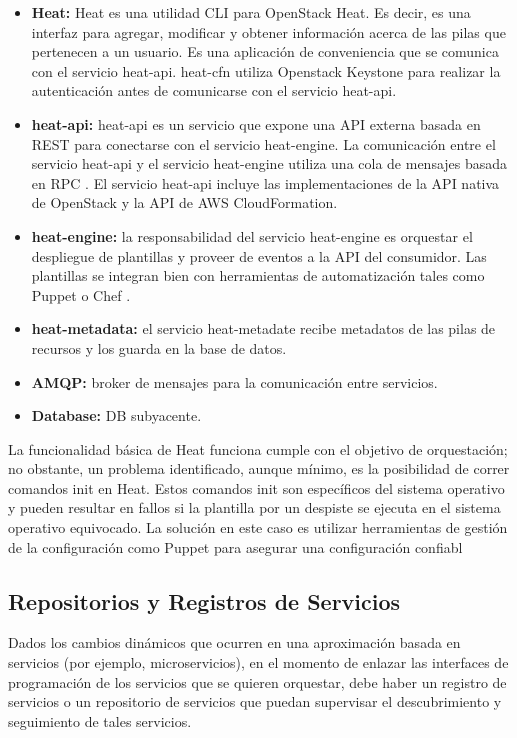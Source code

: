 \begin{itemize}
\item \textbf{Heat:} Heat es una utilidad CLI para OpenStack Heat. Es decir, es una interfaz para agregar, modificar y obtener información acerca de las pilas que pertenecen a un usuario. Es una aplicación de conveniencia que se comunica con el servicio heat-api. heat-cfn utiliza Openstack Keystone para realizar la autenticación antes de comunicarse con el servicio heat-api.
\item \textbf{heat-api:} heat-api es un servicio que expone una API externa basada en REST \parencite{Richardson2008-ng} para conectarse con el servicio heat-engine. La comunicación entre el servicio heat-api y el servicio heat-engine utiliza una cola de mensajes basada en RPC \parencite{Arpaci-Dusseau2015-px}. El servicio heat-api incluye las implementaciones de la API nativa de OpenStack y la API de AWS CloudFormation.
\item \textbf{heat-engine:} la responsabilidad del servicio heat-engine es orquestar el despliegue de plantillas y proveer de eventos a la API del consumidor. Las plantillas se integran bien con herramientas de automatización tales como Puppet \parencite{Puppet2016-ao} o Chef \parencite{Chef2016-cc}.
\item \textbf{heat-metadata:} el servicio heat-metadate recibe metadatos de las pilas de recursos y los guarda en la base de datos.
\item \textbf{AMQP:} broker de mensajes para la comunicación entre servicios.
\item \textbf{Database:} DB subyacente.
\end{itemize}

La funcionalidad básica de Heat funciona cumple con el objetivo de orquestación; no obstante, un problema identificado, aunque mínimo, es la posibilidad de correr comandos init en Heat. Estos comandos init son específicos del sistema operativo y pueden resultar en fallos si la plantilla por un despiste se ejecuta en el sistema operativo equivocado. La solución en este caso es utilizar herramientas de gestión de la configuración como Puppet para asegurar una configuración confiabl

\subsection{Repositorios y Registros de Servicios}
Dados los cambios dinámicos que ocurren en una aproximación basada en servicios (por ejemplo, microservicios), en el momento de enlazar las interfaces de programación de los servicios que se quieren orquestar, debe haber un registro de servicios o un repositorio de servicios que puedan supervisar el descubrimiento y seguimiento de tales servicios.

